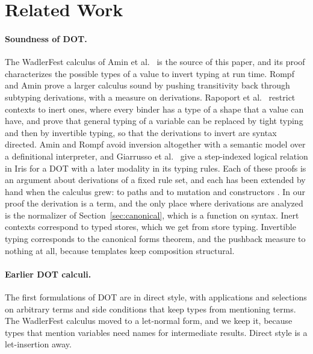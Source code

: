 \section{Related Work}\label{sec:related}

\paragraph{Soundness of DOT.}
The WadlerFest calculus of Amin et al.\ \cite{amin2016essence} is the source of this paper, and its proof characterizes the possible types of a value to invert typing at run time. Rompf and Amin \cite{rompf2016soundness} prove a larger calculus sound by pushing transitivity back through subtyping derivations, with a measure on derivations. Rapoport et al.\ \cite{rapoport2017simple} restrict contexts to inert ones, where every binder has a type of a shape that a value can have, and prove that general typing of a variable can be replaced by tight typing and then by invertible typing, so that the derivations to invert are syntax directed. Amin and Rompf \cite{amin2017definitional} avoid inversion altogether with a semantic model over a definitional interpreter, and Giarrusso et al.\ \cite{giarrusso2020scala} give a step-indexed logical relation in Iris for a DOT with a later modality in its typing rules. Each of these proofs is an argument about derivations of a fixed rule set, and each has been extended by hand when the calculus grew: to paths \cite{rapoport2019path} and to mutation and constructors \cite{kabir2018kdot}. In our proof the derivation is a term, and the only place where derivations are analyzed is the normalizer of Section~\ref{sec:canonical}, which is a function on syntax. Inert contexts correspond to typed stores, which we get from store typing. Invertible typing corresponds to the canonical forms theorem, and the pushback measure to nothing at all, because templates keep composition structural.

\paragraph{Earlier DOT calculi.}
The first formulations of DOT \cite{amin2012dot,amin2014foundations} are in direct style, with applications and selections on arbitrary terms and side conditions that keep types from mentioning terms. The WadlerFest calculus moved to a let-normal form, and we keep it, because types that mention variables need names for intermediate results. Direct style is a let-insertion away.

